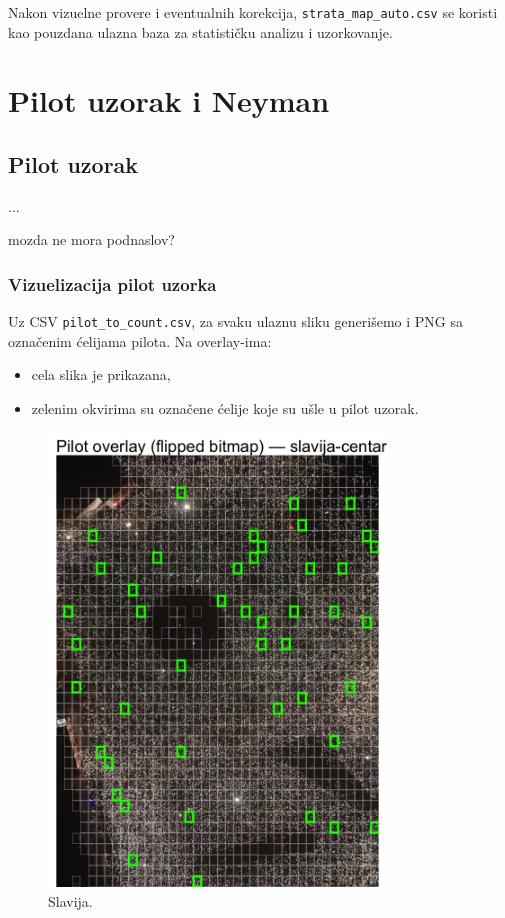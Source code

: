 \documentclass[a4paper,12pt]{article}
\begin{document}
\noindent
Nakon vizuelne provere i eventualnih korekcija, \texttt{strata\_map\_auto.csv} se koristi kao pouzdana ulazna baza za statističku analizu i uzorkovanje.

\section{Pilot uzorak i Neyman}

\subsection{Pilot uzorak}
... 

mozda ne mora podnaslov?

\subsubsection{Vizuelizacija pilot uzorka}

Uz CSV \texttt{pilot\_to\_count.csv}, za svaku ulaznu sliku generišemo i PNG sa označenim ćelijama pilota. Na overlay-ima:
\begin{itemize}
	\item cela slika je prikazana,
	\item zelenim okvirima su označene ćelije koje su ušle u pilot uzorak.
\end{itemize}

\begin{figure}[H] 
	\centering 
	\includegraphics[width=0.8\textwidth]{../outputs/sampling_outputs/plot_overlays_image/pilot_overlay_slavija-centar.png} 
	\caption{Slavija.} 
	\label{fig:slavija} 
\end{figure}
\end{document}
